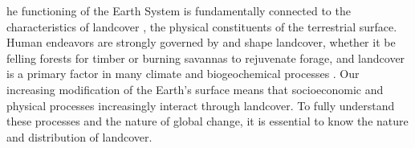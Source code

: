 \documentclass{pnastwo2}
\begin{document}
\begin{article}
\begin{abstract}
{%
}
\end{abstract}


\linenumbers

he functioning of the Earth System is fundamentally connected to the characteristics of landcover \cite{lambin_modelling_1997}, the physical constituents of the terrestrial surface. Human endeavors are strongly governed by and shape landcover, whether it be felling forests for timber or burning savannas to rejuvenate forage, and landcover is a primary factor in many climate and biogeochemical processes \cite{lambin_dynamics_2003}. Our increasing modification of the Earth's surface \cite{lambin_dynamics_2003} means that socioeconomic and physical processes increasingly interact through landcover. To fully understand these processes and the nature of global change, it is essential to know the nature and distribution of landcover.  


\end{article}
\end{document}
